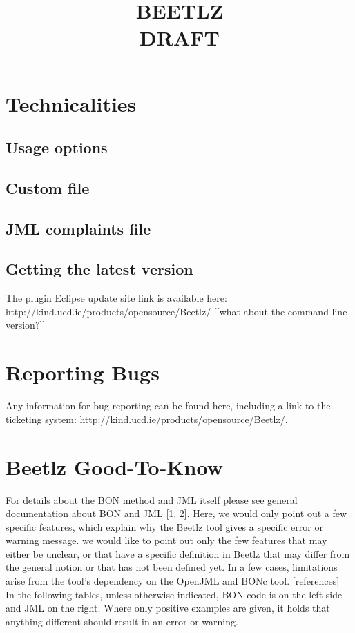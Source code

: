 \documentclass[11pt]{amsart}
\title{BEETLZ \\
DRAFT}
\begin{document}
\maketitle

\section{Technicalities}

\subsection{Usage options}\hfill \newline

\subsection{Custom file}\label{customfile}\hfill \newline

\subsection{JML complaints file}\hfill \newline

\subsection{Getting the latest version}\hfill \newline
The plugin Eclipse update site link is available here:\\
http://kind.ucd.ie/products/opensource/Beetlz/
[[what about the command line version?]]

\section{Reporting Bugs}
Any information for bug reporting can be found here, including a link to the ticketing system:
http://kind.ucd.ie/products/opensource/Beetlz/. 

\section{Beetlz Good-To-Know}
For details about the BON method and JML itself please see general documentation about BON and JML [1, 2]. Here, we would only point out a few specific features, which explain why the Beetlz tool gives a specific error or warning message.  we would like to point out only the few features that may either be unclear, or that have a specific definition in Beetlz that may differ from the general notion or that has not been defined yet. In a few cases, limitations arise from the tool's dependency on the OpenJML and BONc tool. [references]\\
In the following tables, unless otherwise indicated, BON code is on the left side and JML on the right. Where only positive examples are given, it holds that anything different should result in an error or warning. 
\end{document}
